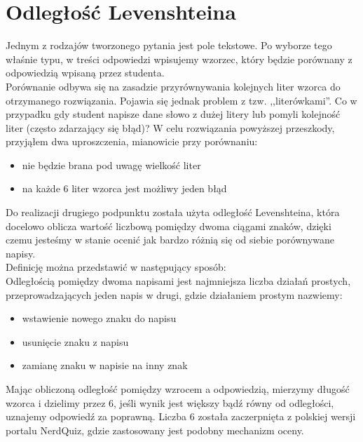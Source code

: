 \documentclass[a4paper,12pt]{article}
\begin{document}
\section{Odległość Levenshteina}
Jednym z rodzajów tworzonego pytania jest pole tekstowe. Po wyborze tego właśnie typu, w
treści odpowiedzi wpisujemy wzorzec, który będzie porównany z odpowiedzią wpisaną przez
studenta.\\
Porównanie odbywa się na zasadzie przyrównywania kolejnych liter wzorca do otrzymanego
rozwiązania. Pojawia się jednak problem z tzw. ,,literówkami''. Co w przypadku gdy student
napisze dane słowo z dużej litery lub pomyli kolejność liter (często zdarzający się błąd)?
W celu rozwiązania powyższej przeszkody, przyjąłem dwa uproszczenia, mianowicie przy
porównaniu:
\begin{itemize}
  \item nie będzie brana pod uwagę wielkość liter
  \item na każde 6 liter wzorca jest możliwy jeden błąd
\end{itemize}
Do realizacji drugiego podpunktu została użyta odległość Levenshteina, która docelowo
oblicza wartość liczbową pomiędzy dwoma ciągami znaków, dzięki czemu jesteśmy w stanie
ocenić jak bardzo różnią się od siebie porównywane napisy.\\
Definicję można przedstawić w następujący sposób: \cite{levenshtein}\\
Odległością pomiędzy dwoma napisami jest najmniejsza liczba działań prostych,
przeprowadzających jeden napis w drugi, gdzie działaniem prostym nazwiemy:
\begin{itemize}
  \item wstawienie nowego znaku do napisu
  \item usunięcie znaku z napisu
  \item zamianę znaku w napisie na inny znak
\end{itemize}
Mając obliczoną odległość pomiędzy wzrocem a odpowiedzią, mierzymy długość wzorca i
dzielimy przez 6, jeśli wynik jest większy bądź równy od odległości, uznajemy odpowiedź
za poprawną. Liczba 6 została zaczerpnięta z polskiej wersji portalu NerdQuiz, gdzie
zastosowany jest podobny mechanizm oceny.

\clearpage


\end{document}
